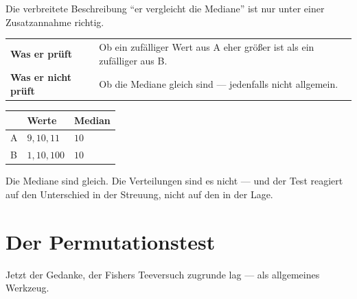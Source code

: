 \begin{warnung}
Die verbreitete Beschreibung \enquote{er vergleicht die Mediane} ist nur unter einer Zusatzannahme richtig.

\begin{center}
\renewcommand{\arraystretch}{1.5}
\begin{tabular}{@{}P{2.6cm}P{6.0cm}@{}}
\toprule
\textbf{Was er prüft} & Ob ein zufälliger Wert aus A eher größer ist als ein zufälliger aus B.\\
\textbf{Was er nicht prüft} & Ob die Mediane gleich sind --- jedenfalls nicht allgemein.\\
\bottomrule
\end{tabular}
\end{center}

\begin{center}
\renewcommand{\arraystretch}{1.45}
\begin{tabular}{@{}P{1.4cm}P{4.4cm}P{1.8cm}@{}}
\toprule
& \textbf{Werte} & \textbf{Median}\\
\midrule
A & $9, 10, 11$ & $10$\\
B & $1, 10, 100$ & $10$\\
\bottomrule
\end{tabular}
\end{center}

Die Mediane sind gleich. Die Verteilungen sind es nicht --- und der Test reagiert auf den Unterschied in der Streuung, nicht auf den in der Lage.

\begin{center}
\begin{minipage}{0.88\textwidth}
\end{minipage}
\end{center}
\end{warnung}

\section{Der Permutationstest}

Jetzt der Gedanke, der Fishers Teeversuch zugrunde lag --- als allgemeines Werkzeug.

